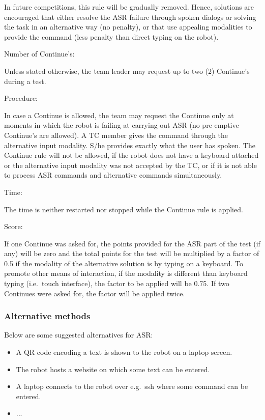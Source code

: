 In future competitions, this rule will be gradually removed. Hence, solutions are encouraged that either resolve the ASR failure through spoken dialogs or solving the task in an alternative way (no penalty), or that use appealing modalities to provide the command (less penalty than direct typing on the robot).

\begin{enumerate}
	{\bf\item Number of Continue's:} Unless stated otherwise, the team leader may request up to two (2) Continue's during a test. 
	{\bf\item Procedure:} In case a Continue is allowed, the team may request the Continue only at moments in which the robot is failing at carrying out ASR (no pre-emptive Continue's are allowed). A TC member gives the command through the alternative input modality. S/he provides exactly what the user has spoken. The Continue rule will not be allowed, if the robot does not have a keyboard attached or the alternative input modality was not accepted by the TC, or if it is not able to process ASR commands and alternative commands simultaneously.
	{\bf\item Time:} The time is neither restarted nor stopped while the Continue rule is applied.
	{\bf\item Score:} If one Continue was asked for, the points provided for the ASR part of the test (if any) will be zero and the total points for the test will be multiplied by a factor of 0.5 if the modality of the alternative solution is by typing on a keyboard. To promote other means of interaction, if the modality is different than keyboard typing (i.e.~touch interface), the factor to be applied will be 0.75. If two Continues were asked for, the factor will be applied twice.
\end{enumerate}

\subsubsection{Alternative methods}
Below are some suggested alternatives for ASR:
\begin{itemize}
	 \item A QR code encoding a text is shown to the robot on a laptop screen.
	 \item The robot hosts a website on which some text can be entered.
	 \item A laptop connects to the robot over e.g.~ssh where some command can be entered. 
 \item ...
\end{itemize}
